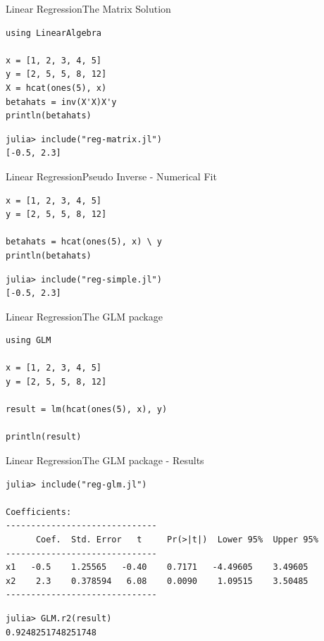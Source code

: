\documentclass[11pt]{beamer}
\begin{document}
\begin{frame}[fragile]{Linear Regression}{The Matrix Solution}
\begin{lstlisting}
using LinearAlgebra
		
x = [1, 2, 3, 4, 5]
y = [2, 5, 5, 8, 12]
X = hcat(ones(5), x)
betahats = inv(X'X)X'y
println(betahats)
\end{lstlisting}
	
\begin{lstlisting}
julia> include("reg-matrix.jl")
[-0.5, 2.3]
\end{lstlisting}
\end{frame}


\begin{frame}[fragile]{Linear Regression}{Pseudo Inverse - Numerical Fit}
\begin{lstlisting}
x = [1, 2, 3, 4, 5]
y = [2, 5, 5, 8, 12]

betahats = hcat(ones(5), x) \ y 
println(betahats)	
\end{lstlisting}

\begin{lstlisting}
julia> include("reg-simple.jl")
[-0.5, 2.3]
\end{lstlisting}
\end{frame}


\begin{frame}[fragile]{Linear Regression}{The GLM package}
\begin{lstlisting}
using GLM 

x = [1, 2, 3, 4, 5]
y = [2, 5, 5, 8, 12]

result = lm(hcat(ones(5), x), y)

println(result)

\end{lstlisting}
\end{frame}


\begin{frame}[fragile]{Linear Regression}{The GLM package - Results}
\begin{lstlisting}[basicstyle=\tiny]
julia> include("reg-glm.jl")
	
Coefficients:
------------------------------
	  Coef.  Std. Error   t     Pr(>|t|)  Lower 95%  Upper 95%
------------------------------
x1   -0.5    1.25565   -0.40    0.7171   -4.49605    3.49605
x2    2.3    0.378594   6.08    0.0090    1.09515    3.50485
------------------------------
\end{lstlisting}

\begin{lstlisting}
julia> GLM.r2(result)
0.9248251748251748
\end{lstlisting}


\end{frame}
\end{document}
